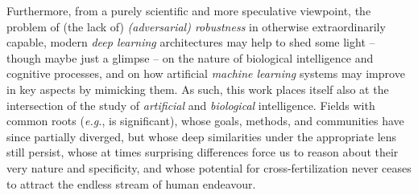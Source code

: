 Furthermore, from a purely scientific and more speculative viewpoint, the problem of (the lack of) \textit{(adversarial) robustness} in otherwise extraordinarily capable, modern \textit{deep learning} architectures may help to shed some light -- though maybe just a glimpse -- on the nature of biological intelligence and cognitive processes, and on how artificial \textit{machine learning} systems may improve in key aspects by mimicking them. As such, this work places itself also at the intersection of the study of \textit{artificial} and \textit{biological} intelligence. Fields with common roots (\textit{e.g.}, \cite{McCullochPitts1990ALC} is significant), whose goals, methods, and communities have since partially diverged, but whose deep similarities under the appropriate lens still persist, whose at times surprising differences force us to reason about their very nature and specificity, and whose potential for cross-fertilization never ceases to attract the endless stream of human endeavour.